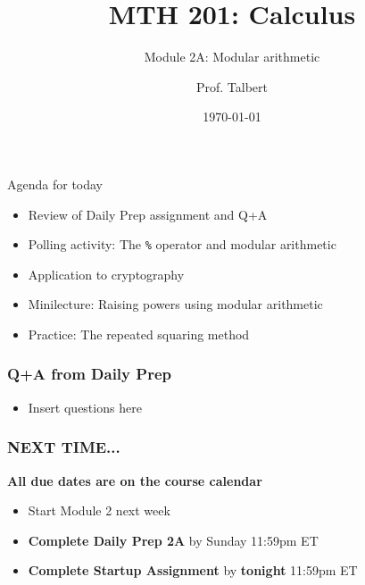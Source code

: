 \documentclass{beamer}
\title{MTH 201: Calculus}
\subtitle{Module 2A: Modular arithmetic}
\author{Prof. Talbert}
\institute{GVSU}
\date{\today}
\begin{document}
\frame{\titlepage}


\begin{frame}{Agenda for today}
    \begin{itemize}
        \item<1-> Review of Daily Prep assignment and Q+A
        \item<2-> Polling activity: The \texttt{\%} operator and modular arithmetic
        \item<3-> Application to cryptography
        \item<4-> Minilecture: Raising powers using modular arithmetic 
        \item<5-> Practice: The repeated squaring method 
    \end{itemize}
\end{frame}

\begin{frame}
    \frametitle{Q+A from Daily Prep}

    \begin{itemize}
        \item Insert questions here 
    \end{itemize}

\end{frame}


\begin{frame}
    \frametitle{NEXT TIME...}

\begin{center}
    \textbf{All due dates are on the course calendar}
\end{center}

    \begin{itemize}
        \item Start Module 2 next week
        \item \textbf{Complete Daily Prep 2A} by Sunday 11:59pm ET 
        \item \textbf{Complete Startup Assignment} by \textbf{tonight} 11:59pm ET 
    \end{itemize}

\end{frame}
\end{document}
